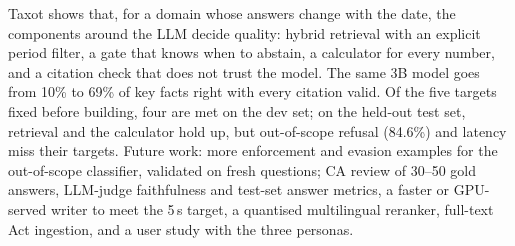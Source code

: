 \documentclass[conference]{IEEEtran}
\begin{document}
Taxot shows that, for a domain whose answers change with the date, the components around the LLM decide
quality: hybrid retrieval with an explicit period filter, a gate that knows when to abstain, a calculator for
every number, and a citation check that does not trust the model. The same 3B model goes from 10\% to 69\% of
key facts right with every citation valid. Of the five targets fixed before building, four are met on the dev set;
on the held-out test set, retrieval and the calculator hold up, but out-of-scope refusal (84.6\%) and latency miss their
targets.
Future work: more enforcement and evasion examples for the out-of-scope classifier, validated on fresh questions; CA review of 30--50 gold answers, LLM-judge faithfulness and test-set answer metrics, a faster or
GPU-served writer to meet the 5\,s target, a quantised multilingual reranker, full-text Act ingestion, and a
user study with the three personas.
\end{document}
